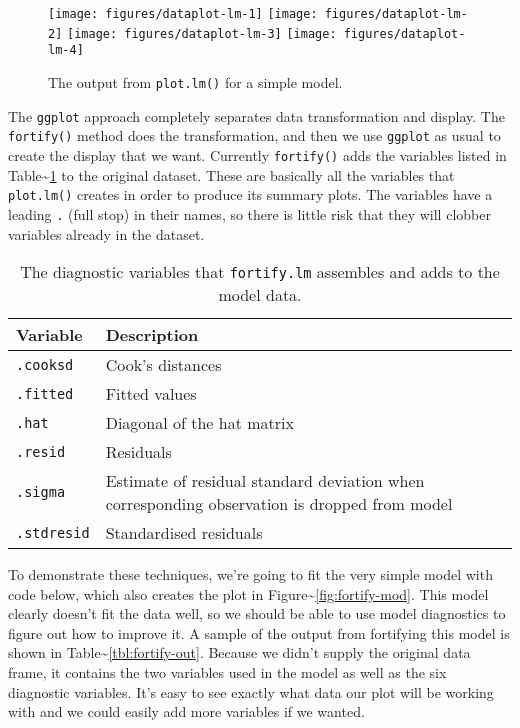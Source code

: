 \begin{figure}

{\centering \texttt{[image: figures/dataplot-lm-1]} \texttt{[image: figures/dataplot-lm-2]} \texttt{[image: figures/dataplot-lm-3]} \texttt{[image: figures/dataplot-lm-4]} 

}

\caption{The output from \texttt{plot.lm()} for a simple model.\label{fig:plot-lm}}
\end{figure}

The \texttt{ggplot} approach completely separates data transformation
and display. The \texttt{fortify()} method does the transformation, and
then we use \texttt{ggplot} as usual to create the display that we want.
Currently \texttt{fortify()} adds the variables listed in
Table\textasciitilde{}\ref{tbl:fortify-vars} to the original dataset.
These are basically all the variables that \texttt{plot.lm()} creates in
order to produce its summary plots. The variables have a leading
\texttt{.} (full stop) in their names, so there is little risk that they
will clobber variables already in the dataset.

\begin{table}
  \centering
  \begin{tabular}{lp{2.5in}}
    \toprule
    Variable & Description \\
    \midrule
    \texttt{.cooksd}   & Cook's distances \\
    \texttt{.fitted}   & Fitted values \\
    \texttt{.hat}      & Diagonal of the hat matrix \\
    \texttt{.resid}    & Residuals \\
    \texttt{.sigma}    & Estimate of residual standard deviation when corresponding observation is dropped from model \\
    \texttt{.stdresid} & Standardised residuals \\
    \bottomrule
  \end{tabular}
  \caption{The diagnostic variables that \texttt{fortify.lm} assembles and adds to the model data.}
  \label{tbl:fortify-vars}
\end{table}

To demonstrate these techniques, we're going to fit the very simple
model with code below, which also creates the plot in
Figure\textasciitilde{}\ref{fig:fortify-mod}. This model clearly doesn't
fit the data well, so we should be able to use model diagnostics to
figure out how to improve it. A sample of the output from fortifying
this model is shown in Table\textasciitilde{}\ref{tbl:fortify-out}.
Because we didn't supply the original data frame, it contains the two
variables used in the model as well as the six diagnostic variables.
It's easy to see exactly what data our plot will be working with and we
could easily add more variables if we wanted.

